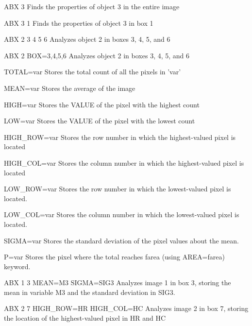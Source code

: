 {\newpage\clearpage
{}%
\begin{example}
  \item[ABX 3\hfill]{Finds the properties of object 3 in the entire image}
  \item[ABX 3 1\hfill]{Finds the properties of object 3 in box 1}
  \item[ABX 2 3 4 5 6\hfill]{Analyzes object 2 in boxes 3, 4, 5, and 6}
  \item[ABX 2 BOX=3,4,5,6 \hfill]{Analyzes object 2 in boxes 3, 4, 5, and 6}
\end{example}%
\lthtmlfigureZ
\lthtmlcheckvsize\clearpage}

{\newpage\clearpage
{}%
\begin{example}
  \item[TOTAL=var\hfill]{Stores the total count of all the pixels in 'var'}
  \item[MEAN=var\hfill]{Stores the average of the image}
  \item[HIGH=var\hfill]{Stores the VALUE of the pixel with the highest count}
  \item[LOW=var\hfill]{Stores the VALUE of the pixel with the lowest count}
  \item[HIGH\_ROW=var\hfill]{Stores the row number in which the highest-valued
       pixel is located}
  \item[HIGH\_COL=var\hfill]{Stores the column number in which the 
       highest-valued pixel is located}
  \item[LOW\_ROW=var\hfill]{Stores the row number in which the lowest-valued
       pixel is located.}
  \item[LOW\_COL=var\hfill]{Stores the column number in which the lowest-valued
       pixel is located.}
  \item[SIGMA=var\hfill]{Stores the standard deviation of the pixel values
       about the mean.}
  \item[P=var \hfill]{ Stores the pixel where the total reaches farea
       (using AREA=farea) keyword.}
\end{example}%
\lthtmlfigureZ
\lthtmlcheckvsize\clearpage}

{\newpage\clearpage
{}%
\begin{example}
  \item[ABX 1 3 MEAN=M3 SIGMA=SIG3\hfill]{Analyzes image 1 in box 3, storing
       the mean in variable M3 and the standard deviation in SIG3.}
  \item[ABX 2 7 HIGH\_ROW=HR HIGH\_COL=HC\hfill]{ Analyzes image 2 in box 7, 
       storing the location of the highest-valued pixel in HR and HC}
\end{example}%
\lthtmlfigureZ
\lthtmlcheckvsize\clearpage}

